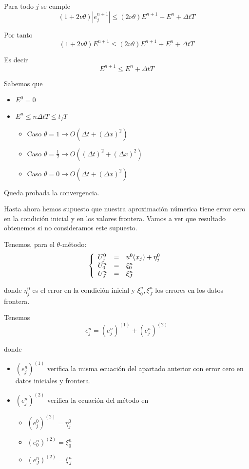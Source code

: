 Para todo $j$ se cumple
$$(1+2\nu\theta)|e_j^{n+1}| \le (2\nu\theta)E^{n+1}+E^n+\Delta t T$$

Por tanto
$$(1+2\nu\theta)E^{n+1} \le (2\nu\theta)E^{n+1}+E^n+\Delta t T$$

Es decir
$$E^{n+1} \le E^n + \Delta t T$$

Sabemos que
\begin{itemize}
	\item $E^0 = 0$
	\item $E^n \le n\Delta t T \le t_f T$
	\begin{itemize}
		\item Caso $\theta = 1 \to O(\Delta t + (\Delta x)^2)$
		\item Caso $\theta = \frac{1}{2} \to O((\Delta t)^2 + (\Delta x)^2)$
		\item Caso $\theta = 0 \to O(\Delta t + (\Delta x)^2)$
	\end{itemize}
\end{itemize}

Queda probada la convergencia.

Hasta ahora hemos supuesto que nuestra aproximación númerica tiene error cero en la condición inicial y en los valores frontera. Vamos a ver que resultado obtenemos si no consideramos este supuesto. 

Tenemos, para el $\theta$-método:
\begin{equation*}
	\left\{
	\begin{array}{l l l}
		U_j^0 & = & u^0(x_j) + \eta_j^0\\
		U_0^n & = & \xi_0^n\\
		U_J^n & = & \xi_J^n
	\end{array}
	\right.
\end{equation*}

donde $\eta_j^0$ es el error en la condición inicial y $\xi_0^n, \xi_J^n$ los errores en los datos frontera.

Tenemos 
$$e_j^n = (e_j^n)^{(1)}+(e_j^n)^{(2)}$$

donde
\begin{itemize}
	\item $(e_j^n)^{(1)}$ verifica la misma ecuación del apartado anterior con error cero en datos iniciales y frontera.
	\item $(e_j^n)^{(2)}$ verifica la ecuación del método en
	\begin{itemize}
		\item $(e_j^0)^{(2)} = \eta_j^0$
		\item $(e_0^n)^{(2)} = \xi_0^n$
		\item $(e_J^n)^{(2)} = \xi_J^n$
	\end{itemize}
\end{itemize}

